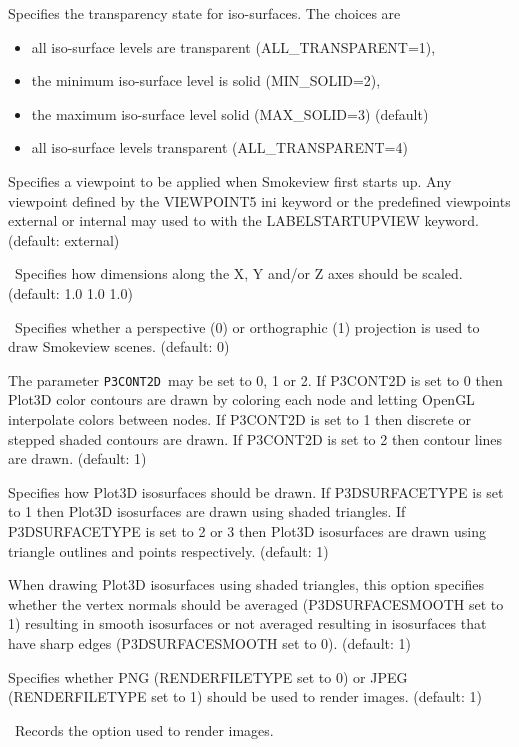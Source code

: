 \documentclass[11pt,twoside]{book}
\newcommand{\hitem}[1]{\item[{\bf #1} \hfill]}
\begin{document}
\hitem{ISOTRANS}Specifies the transparency state for iso-surfaces. The choices
are
\begin{itemize}
\item all iso-surface levels are transparent (ALL\_TRANSPARENT=1),
\item the minimum iso-surface level is solid (MIN\_SOLID=2),
\item the maximum iso-surface level solid (MAX\_SOLID=3) (default)
\item all iso-surface levels transparent (ALL\_TRANSPARENT=4)
\end{itemize}


\hitem{LABELSTARTUPVIEW}Specifies a viewpoint to be applied when Smokeview first starts up.
Any viewpoint defined by the VIEWPOINT5 ini keyword or the predefined viewpoints external or internal may used to with the LABELSTARTUPVIEW keyword.
(default: external)

\hitem{MSCALE}\ Specifies how dimensions along the X, Y
and/or Z axes should be scaled. (default: 1.0 1.0 1.0)

\hitem{PROJECTION}\ Specifies whether a perspective (0) or orthographic (1) projection
is used to draw Smokeview scenes.
(default: 0)

\hitem{P3CONT2D}The parameter {\tt P3CONT2D}\ may be set to 0, 1 or
2.  If P3CONT2D is set to 0 then Plot3D color contours are drawn
by coloring each node and letting OpenGL interpolate colors
between nodes.  If P3CONT2D is set to 1 then discrete or stepped
shaded contours are drawn.  If P3CONT2D is set to 2 then contour
lines are drawn. (default: 1)

\hitem{P3DSURFACETYPE}Specifies how Plot3D isosurfaces should be
drawn.  If P3DSURFACETYPE is set to 1 then Plot3D isosurfaces are
drawn using shaded triangles.  If P3DSURFACETYPE is set to 2 or 3
then Plot3D isosurfaces are drawn using triangle outlines and
points respectively. (default: 1)

\hitem{P3DSURFACESMOOTH}When drawing Plot3D isosurfaces using
shaded triangles, this option specifies whether the vertex normals
should be averaged (P3DSURFACESMOOTH set to 1) resulting in smooth
isosurfaces or not averaged resulting in isosurfaces that have
sharp edges (P3DSURFACESMOOTH set to 0). (default: 1)

\hitem{RENDERFILETYPE}Specifies whether PNG (RENDERFILETYPE set to 0) or
JPEG (RENDERFILETYPE set to 1)
should be used to render images.  (default: 1)

\hitem{RENDEROPTION}\ Records the option used to render images.
\end{document}
